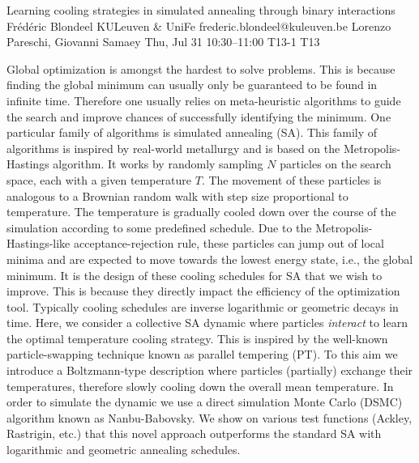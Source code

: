 \begin{talk}
  {Learning cooling strategies in simulated annealing through binary interactions}%
  {Fr\'ed\'eric Blondeel}%
  {KULeuven \& UniFe}%
  {frederic.blondeel@kuleuven.be}%
  {Lorenzo Pareschi, Giovanni Samaey}%
  {}%
  {Thu, Jul 31 10:30--11:00}%
  {T13-1}%
  {T13}%
  
    
   
Global optimization is amongst the hardest to solve problems. This is because finding the global minimum can usually only be guaranteed to be found in infinite time. Therefore one usually relies on meta-heuristic algorithms to guide the search and improve chances of successfully identifying the minimum. One particular family of algorithms is simulated annealing (SA). This family of algorithms is inspired by real-world metallurgy and is based on the Metropolis-Hastings algorithm. It works by randomly sampling $N$ particles on the search space, each with a given temperature $T$. The movement of these particles is analogous to a Brownian random walk with step size proportional to temperature. The temperature is gradually cooled down over the course of the simulation according to some predefined schedule. Due to the Metropolis-Hastings-like acceptance-rejection rule, these particles can jump out of local minima and are expected to move towards the lowest energy state, i.e., the global minimum. It is the design of these cooling schedules for SA that we wish to improve. This is because they directly impact the efficiency of the optimization tool. Typically cooling schedules are inverse logarithmic or geometric decays in time. Here, we consider a collective SA dynamic where particles \textit{interact} to learn the optimal temperature cooling strategy. This is inspired by the well-known particle-swapping technique known as parallel tempering (PT). To this aim we introduce a Boltzmann-type description where particles (partially) exchange their temperatures, therefore slowly cooling down the overall mean temperature. In order to simulate the dynamic we use a direct simulation Monte Carlo (DSMC) algorithm known as Nanbu-Babovsky. We show on various test functions (Ackley, Rastrigin, etc.) that this novel approach outperforms the standard SA with logarithmic and geometric annealing schedules.

\end{talk}

